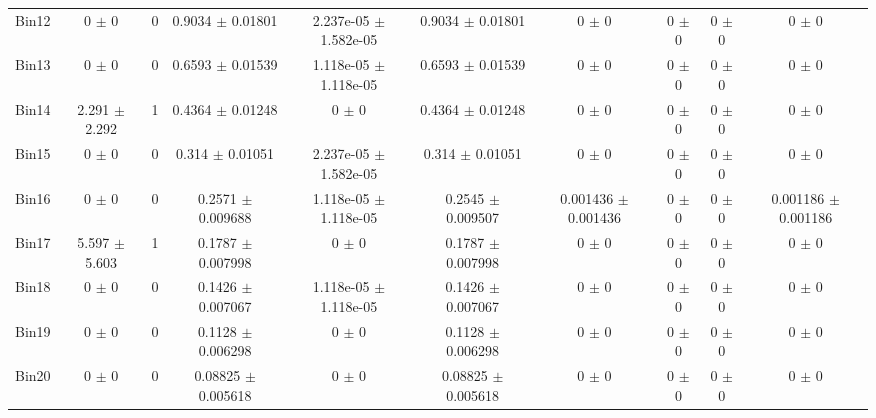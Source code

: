 \begin{tabular}{@{\extracolsep{4pt}}lccccccccc@{}}
     Bin12 & 0 $\pm$ 0 & 0 & 0.9034 $\pm$ 0.01801 & 2.237e-05 $\pm$ 1.582e-05 & 0.9034 $\pm$ 0.01801 & 0 $\pm$ 0 & 0 $\pm$ 0 & 0 $\pm$ 0 & 0 $\pm$ 0 \\ 
     Bin13 & 0 $\pm$ 0 & 0 & 0.6593 $\pm$ 0.01539 & 1.118e-05 $\pm$ 1.118e-05 & 0.6593 $\pm$ 0.01539 & 0 $\pm$ 0 & 0 $\pm$ 0 & 0 $\pm$ 0 & 0 $\pm$ 0 \\ 
     Bin14 & 2.291 $\pm$ 2.292 & 1 & 0.4364 $\pm$ 0.01248 & 0 $\pm$ 0 & 0.4364 $\pm$ 0.01248 & 0 $\pm$ 0 & 0 $\pm$ 0 & 0 $\pm$ 0 & 0 $\pm$ 0 \\ 
     Bin15 & 0 $\pm$ 0 & 0 & 0.314 $\pm$ 0.01051 & 2.237e-05 $\pm$ 1.582e-05 & 0.314 $\pm$ 0.01051 & 0 $\pm$ 0 & 0 $\pm$ 0 & 0 $\pm$ 0 & 0 $\pm$ 0 \\ 
     Bin16 & 0 $\pm$ 0 & 0 & 0.2571 $\pm$ 0.009688 & 1.118e-05 $\pm$ 1.118e-05 & 0.2545 $\pm$ 0.009507 & 0.001436 $\pm$ 0.001436 & 0 $\pm$ 0 & 0 $\pm$ 0 & 0.001186 $\pm$ 0.001186 \\ 
     Bin17 & 5.597 $\pm$ 5.603 & 1 & 0.1787 $\pm$ 0.007998 & 0 $\pm$ 0 & 0.1787 $\pm$ 0.007998 & 0 $\pm$ 0 & 0 $\pm$ 0 & 0 $\pm$ 0 & 0 $\pm$ 0 \\ 
     Bin18 & 0 $\pm$ 0 & 0 & 0.1426 $\pm$ 0.007067 & 1.118e-05 $\pm$ 1.118e-05 & 0.1426 $\pm$ 0.007067 & 0 $\pm$ 0 & 0 $\pm$ 0 & 0 $\pm$ 0 & 0 $\pm$ 0 \\ 
     Bin19 & 0 $\pm$ 0 & 0 & 0.1128 $\pm$ 0.006298 & 0 $\pm$ 0 & 0.1128 $\pm$ 0.006298 & 0 $\pm$ 0 & 0 $\pm$ 0 & 0 $\pm$ 0 & 0 $\pm$ 0 \\ 
     Bin20 & 0 $\pm$ 0 & 0 & 0.08825 $\pm$ 0.005618 & 0 $\pm$ 0 & 0.08825 $\pm$ 0.005618 & 0 $\pm$ 0 & 0 $\pm$ 0 & 0 $\pm$ 0 & 0 $\pm$ 0 \\ 
\hline\hline
  \end{tabular}
